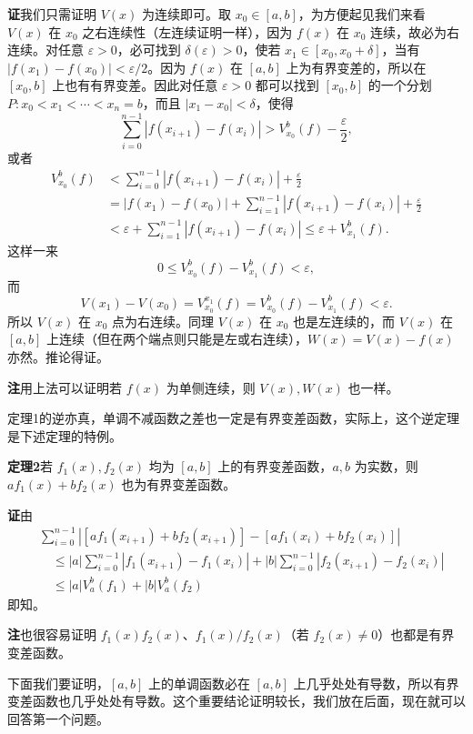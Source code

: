 \noindent\textbf{证}\quad 我们只需证明 $V(x)$ 为连续即可。取 $x_0\in[a,b]$，为方便起见我们来看 $V(x)$ 在 $x_0$ 之右连续性（左连续证明一样），因为 $f(x)$ 在 $x_0$ 连续，故必为右连续。对任意 $\varepsilon>0$，必可找到 $\delta(\varepsilon)>0$，使若 $x_1\in[x_0,x_0+\delta]$，当有 $|f(x_1)-f(x_0)|<\varepsilon/2$。因为 $f(x)$ 在 $[a,b]$ 上为有界变差的，所以在 $[x_0,b]$ 上也有有界变差。因此对任意 $\varepsilon>0$ 都可以找到 $[x_0,b]$ 的一个分划 $P:x_0<x_1<\cdots<x_n=b$，而且 $|x_1-x_0|<\delta$，使得
\[
 \sum_{i=0}^{n-1}|f(x_{i+1})-f(x_i)|>V_{x_0}^b(f)-\frac{\varepsilon}{2},
\]
或者
\[
\begin{aligned}
 V_{x_0}^b(f)
 &<\sum_{i=0}^{n-1}|f(x_{i+1})-f(x_i)|+\frac{\varepsilon}{2}\\
 &=|f(x_1)-f(x_0)|+\sum_{i=1}^{n-1}|f(x_{i+1})-f(x_i)|+\frac{\varepsilon}{2}\\
 &<\varepsilon+\sum_{i=1}^{n-1}|f(x_{i+1})-f(x_i)|\le\varepsilon+V_{x_1}^b(f).
\end{aligned}
\]
这样一来
\[
 0\le V_{x_0}^b(f)-V_{x_1}^b(f)<\varepsilon,
\]
而
\[
 V(x_1)-V(x_0)=V_{x_0}^{x_1}(f)=V_{x_0}^b(f)-V_{x_1}^b(f)<\varepsilon.
\]
所以 $V(x)$ 在 $x_0$ 点为右连续。同理 $V(x)$ 在 $x_0$ 也是左连续的，而 $V(x)$ 在 $[a,b]$ 上连续（但在两个端点则只能是左或右连续），$W(x)=V(x)-f(x)$ 亦然。推论得证。

\noindent\textbf{注}\quad 用上法可以证明若 $f(x)$ 为单侧连续，则 $V(x),W(x)$ 也一样。

定理1的逆亦真，单调不减函数之差也一定是有界变差函数，实际上，这个逆定理是下述定理的特例。

\noindent\textbf{定理2}\quad 若 $f_1(x),f_2(x)$ 均为 $[a,b]$ 上的有界变差函数，$a,b$ 为实数，则 $af_1(x)+bf_2(x)$ 也为有界变差函数。

\noindent\textbf{证}\quad 由
\[
\begin{aligned}
&\sum_{i=0}^{n-1}|[af_1(x_{i+1})+bf_2(x_{i+1})]-[af_1(x_i)+bf_2(x_i)]|\\
&\quad\le |a|\sum_{i=0}^{n-1}|f_1(x_{i+1})-f_1(x_i)|
      +|b|\sum_{i=0}^{n-1}|f_2(x_{i+1})-f_2(x_i)|\\
&\quad\le |a|V_a^b(f_1)+|b|V_a^b(f_2)
\end{aligned}
\]
即知。

\noindent\textbf{注}\quad 也很容易证明 $f_1(x)f_2(x)$、$f_1(x)/f_2(x)$（若 $f_2(x)\ne0$）也都是有界变差函数。

下面我们要证明，$[a,b]$ 上的单调函数必在 $[a,b]$ 上几乎处处有导数，所以有界变差函数也几乎处处有导数。这个重要结论证明较长，我们放在后面，现在就可以回答第一个问题。

